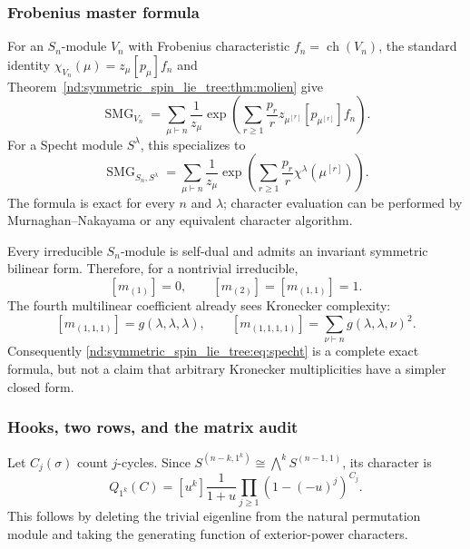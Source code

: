 \documentclass[10pt]{article}
\newcommand{\SMG}{\operatorname{SMG}}
\newcommand{\MGF}{\SMG}
\newcommand{\ch}{\operatorname{ch}}
\begin{document}
\subsubsection{Frobenius master formula}

For an $S_n$-module $V_n$ with Frobenius characteristic $f_n=\ch(V_n)$,
the standard identity $\chi_{V_n}(\mu)=z_\mu[p_\mu]f_n$ and
Theorem~\ref{nd:symmetric_spin_lie_tree:thm:molien} give
\begin{equation}\label{nd:symmetric_spin_lie_tree:eq:frob-master}
 \boxed{
 \MGF_{V_n}
 =\sum_{\mu\vdash n}\frac1{z_\mu}
 \exp\!\left(
 \sum_{r\ge1}\frac{p_r}{r}
 z_{\mu^{[r]}}[p_{\mu^{[r]}}]f_n
 \right).}
\end{equation}
For a Specht module $S^\lambda$, this specializes to
\begin{equation}\label{nd:symmetric_spin_lie_tree:eq:specht}
 \boxed{
 \MGF_{S_n,S^\lambda}
 =\sum_{\mu\vdash n}\frac1{z_\mu}
 \exp\!\left(\sum_{r\ge1}\frac{p_r}{r}
 \chi^\lambda(\mu^{[r]})\right).}
\end{equation}
The formula is exact for every $n$ and $\lambda$; character evaluation can be
performed by Murnaghan--Nakayama or any equivalent character algorithm.

Every irreducible $S_n$-module is self-dual and admits an invariant symmetric
bilinear form.  Therefore, for a nontrivial irreducible,
\[
 [m_{(1)}]=0,
 \qquad [m_{(2)}]=[m_{(1,1)}]=1.
\]
The fourth multilinear coefficient already sees Kronecker complexity:
\[
 [m_{(1,1,1)}]=g(\lambda,\lambda,\lambda),
 \qquad
 [m_{(1,1,1,1)}]=\sum_{\nu\vdash n}g(\lambda,\lambda,\nu)^2.
\]
Consequently \eqref{nd:symmetric_spin_lie_tree:eq:specht} is a complete exact formula, but not a claim
that arbitrary Kronecker multiplicities have a simpler closed form.

\subsubsection{Hooks, two rows, and the matrix audit}

Let $C_j(\sigma)$ count $j$-cycles.  Since
$S^{(n-k,1^k)}\cong\bigwedge^kS^{(n-1,1)}$, its character is
\begin{equation}\label{nd:symmetric_spin_lie_tree:eq:hook}
 \boxed{Q_{1^k}(C)=[u^k]\frac1{1+u}
 \prod_{j\ge1}(1-(-u)^j)^{C_j}.}
\end{equation}
This follows by deleting the trivial eigenline from the natural permutation
module and taking the generating function of exterior-power characters.
\end{document}
